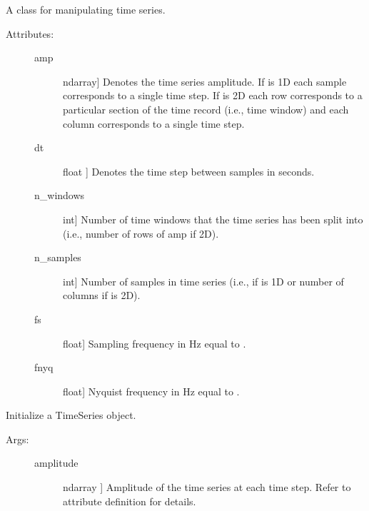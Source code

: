 \documentclass[letterpaper,10pt,english,openany,oneside]{sphinxmanual}
\begin{document}
\begin{fulllineitems}
\label{\detokenize{index:sigpropy.TimeSeries}}
A class for manipulating time series.
\begin{description}
\item[{Attributes:}] \leavevmode\begin{description}
\item[{amp}] \leavevmode{[}ndarray{]}
Denotes the time series amplitude. If  is 1D each 
sample corresponds to a single time step. If  is 2D 
each row corresponds to a particular section of the time
record (i.e., time window) and each column corresponds to a
single time step.

\item[{dt}] \leavevmode{[}float {]}
Denotes the time step between samples in seconds.

\item[{n\_windows}] \leavevmode{[}int{]}
Number of time windows that the time series has been split
into (i.e., number of rows of amp if 2D).

\item[{n\_samples}] \leavevmode{[}int{]}
Number of samples in time series (i.e.,  if 
is 1D or number of columns if  is 2D).

\item[{fs}] \leavevmode{[}float{]}
Sampling frequency in Hz equal to .

\item[{fnyq}] \leavevmode{[}float{]}
Nyquist frequency in Hz equal to .

\end{description}

\end{description}

\begin{fulllineitems}
\label{\detokenize{index:sigpropy.TimeSeries.__init__}}
Initialize a TimeSeries object.
\begin{description}
\item[{Args:}] \leavevmode\begin{description}
\item[{amplitude}] \leavevmode{[}ndarray {]}
Amplitude of the time series at each time step. Refer to
attribute definition for details.


\end{description}
\end{description}
\end{fulllineitems}
\end{fulllineitems}
\end{document}
